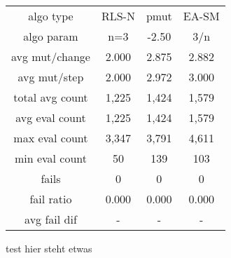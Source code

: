 \begin{tabular}[h]{cccc}
algo type&            RLS-N&      pmut&     EA-SM\\
algo param&             n=3&     -2.50&       3/n\\
avg mut/change&       2.000&     2.875&     2.882\\
avg mut/step&         2.000&     2.972&     3.000\\
\hline
total avg count&      1,225&     1,424&     1,579\\
avg eval count&       1,225&     1,424&     1,579\\
max eval count&       3,347&     3,791&     4,611\\
min eval count&          50&       139&       103\\
\hline
fails&                    0&         0&         0\\
fail ratio&           0.000&     0.000&     0.000\\
avg fail dif&             -&         -&         -\\
\end{tabular}


test hier steht etwas